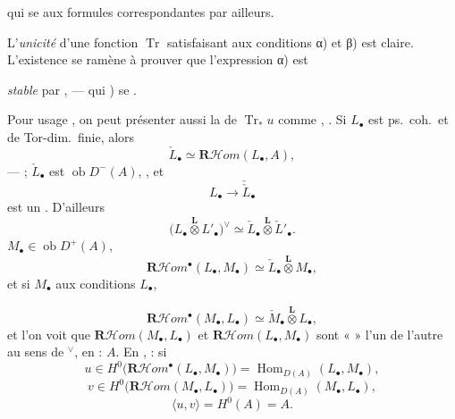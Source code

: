 \documentclass[11pt,a4paper]{article}
\begin{document}
qui se  aux formules correspondantes
 par ailleurs.

L'\textit{unicité} d'une fonction $\operatorname{Tr}$ satisfaisant aux
conditions α) et β) est claire. L'existence \struck{\ill{}} se ramène à
prouver que l'expression α) est

\textit{stable} par , — qui 
 ) se 
\ill{} \ill{} \ill{} \ill{} \ill{} \ill{} \ill{} 
\ill{} \ill{} \ill{} \ill{} \ill{}  \ill{}
.

Pour usage , on peut présenter aussi la
 de $\operatorname{Tr}_* u$ comme ,
\ill{} \ill{} \ill{}  \ill{}. Si $L_\bullet$ est
ps.\ coh.\ et de Tor-dim.\ finie, alors
\[
  \check{L}_\bullet \simeq \mathbf{R}\mathcal{H}om(L_\bullet, A),
\]
 — \ill{} \ill{} \ill{} ;
$\check{L}_\bullet$ est   \ill{} \ill{} \ill{}
$\operatorname{ob} D^-(A)$,  
\struck{\ill{}} \ill{}, et 
\[
  L_\bullet \to \check{\check{L}}_\bullet
\]
est un . D'ailleurs
\[
  \bigl(L_\bullet \overset{\mathbf{L}}{\otimes} L'_\bullet\bigr)^{\vee}
  \simeq \check{L}_\bullet \overset{\mathbf{L}}{\otimes} \check{L}'_\bullet .
\]
  $M_\bullet \in \operatorname{ob} D^+(A)$,
\ill{} \ill{} \ill{}  
\[
  \mathbf{R}\mathcal{H}om^\bullet(L_\bullet, M_\bullet) \simeq
  \check{L}_\bullet \overset{\mathbf{L}}{\otimes} M_\bullet ,
\]
et si $M_\bullet$  aux  conditions
 $L_\bullet$,  

\[
  \mathbf{R}\mathcal{H}om^\bullet(M_\bullet, L_\bullet) \simeq
  \check{M}_\bullet \overset{\mathbf{L}}{\otimes} L_\bullet ,
\]
et l'on voit que $\mathbf{R}\mathcal{H}om(M_\bullet, L_\bullet)$ et
$\mathbf{R}\mathcal{H}om(L_\bullet, M_\bullet)$ sont «  »
l'un de l'autre au sens de ${}^\vee$, en 
 \textit{\ill{}} :  \ill{} \ill{}
$A$. En , \ill{} \ill{} 
 \ill{} : si
\[
  u \in H^0\bigl(\mathbf{R}\mathcal{H}om^\bullet(L_\bullet, M_\bullet)\bigr)
  = \operatorname{Hom}_{D(A)}(L_\bullet, M_\bullet) ,
\]
\[
  v \in H^0\bigl(\mathbf{R}\mathcal{H}om(M_\bullet, L_\bullet)\bigr)
  = \operatorname{Hom}_{D(A)}(M_\bullet, L_\bullet) ,
\]
\ill{}  
\[
  \langle u, v \rangle = H^0(A) = A .
\]
\end{document}

